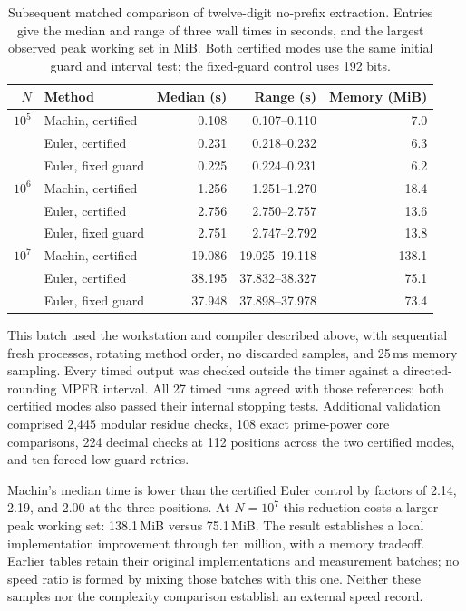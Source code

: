\documentclass[11pt]{article}
\numberwithin{equation}{section}
\theoremstyle{definition}
\begin{document}
\begin{table}[htbp]
\centering
\small
\caption{Subsequent matched comparison of twelve-digit no-prefix
extraction. Entries give the median and range of three wall times
in seconds, and the largest observed peak working set in MiB.
Both certified modes use the same initial guard and interval test;
the fixed-guard control uses 192 bits.}
\label{tab:certified-performance}
\setlength{\tabcolsep}{4pt}
\begin{tabular}{rlrrr}
\toprule
$N$ & Method & Median (s) & Range (s) & Memory (MiB)\\
\midrule
$10^5$ & Machin, certified & 0.108 & 0.107--0.110 & 7.0\\
 & Euler, certified & 0.231 & 0.218--0.232 & 6.3\\
 & Euler, fixed guard & 0.225 & 0.224--0.231 & 6.2\\
\addlinespace
$10^6$ & Machin, certified & 1.256 & 1.251--1.270 & 18.4\\
 & Euler, certified & 2.756 & 2.750--2.757 & 13.6\\
 & Euler, fixed guard & 2.751 & 2.747--2.792 & 13.8\\
\addlinespace
$10^7$ & Machin, certified & 19.086 & 19.025--19.118 & 138.1\\
 & Euler, certified & 38.195 & 37.832--38.327 & 75.1\\
 & Euler, fixed guard & 37.948 & 37.898--37.978 & 73.4\\
\bottomrule
\end{tabular}
\end{table}

This batch used the workstation and compiler described above,
with sequential fresh processes, rotating method order, no
discarded samples, and 25\,ms memory sampling. Every timed output
was checked outside the timer against a directed-rounding MPFR
interval. All 27 timed runs agreed with those references; both
certified modes also passed their internal stopping tests.
Additional validation comprised 2,445 modular residue checks,
108 exact prime-power core comparisons, 224 decimal checks at
112 positions across the two certified modes, and ten forced
low-guard retries.

Machin's median time is lower than the certified Euler control
by factors of 2.14, 2.19, and 2.00 at the three positions.
At $N=10^7$ this reduction costs a larger peak working set:
138.1\,MiB versus 75.1\,MiB. The result establishes a local
implementation improvement through ten million, with a memory
tradeoff. Earlier tables retain their original implementations
and measurement batches; no speed ratio is formed by mixing
those batches with this one. Neither these samples nor the
complexity comparison establish an external speed record.
\end{document}
